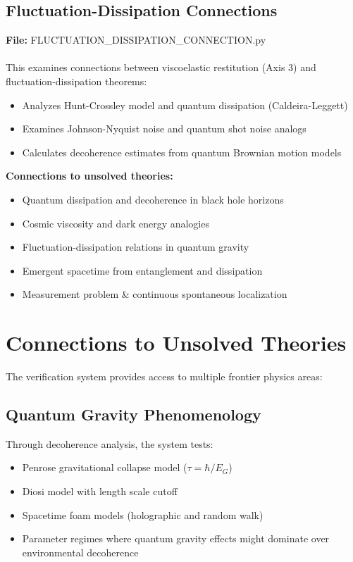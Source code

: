 \documentclass[11pt]{article}
\begin{document}
\subsection{Fluctuation-Dissipation Connections}
\textbf{File:} FLUCTUATION\_DISSIPATION\_CONNECTION.py
\\\\
This examines connections between viscoelastic restitution (Axis 3) and fluctuation-dissipation theorems:
\begin{itemize}
\item Analyzes Hunt-Crossley model and quantum dissipation (Caldeira-Leggett)
\item Examines Johnson-Nyquist noise and quantum shot noise analogs
\item Calculates decoherence estimates from quantum Brownian motion models
\end{itemize}
\textbf{Connections to unsolved theories:}
\begin{itemize}
\item Quantum dissipation and decoherence in black hole horizons
\item Cosmic viscosity and dark energy analogies
\item Fluctuation-dissipation relations in quantum gravity
\item Emergent spacetime from entanglement and dissipation
\item Measurement problem \& continuous spontaneous localization
\end{itemize}

\section{Connections to Unsolved Theories}
The verification system provides access to multiple frontier physics areas:

\subsection{Quantum Gravity Phenomenology}
Through decoherence analysis, the system tests:
\begin{itemize}
\item Penrose gravitational collapse model ($\tau = \hbar/E_G$)
\item Diosi model with length scale cutoff
\item Spacetime foam models (holographic and random walk)
\item Parameter regimes where quantum gravity effects might dominate over environmental decoherence
\end{itemize}
\end{document}
